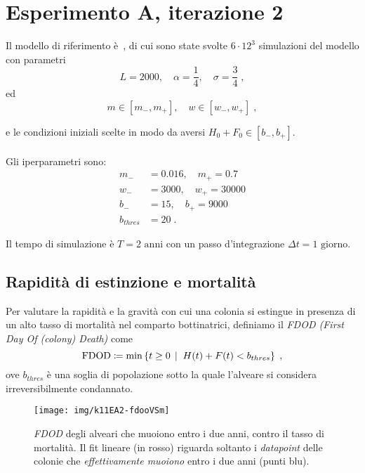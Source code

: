 \section{Esperimento A, iterazione 2}
Il modello di riferimento è~\cite{khoury2011}, di cui sono state svolte $6 \cdot 12^{3}$ simulazioni del
modello con parametri
$$L = 2000, \quad \alpha = \frac{1}{4}, \quad \sigma = \frac{3}{4} \; ,$$
ed
$$m \in \left[ m_-, m_+ \right], \quad w \in \left[ w_-, w_+ \right] \; ,$$

e le condizioni iniziali scelte in modo da aversi $H_0+F_0 \in \left[ b_-, b_+ \right]$.

\paragraph{}
Gli iperparametri sono:
\begin{equation*}
\begin{split}
m_- &= 0.016, \quad m_+ = 0.7 \\
w_- &= 3000, \quad w_+ = 30000 \\
b_- &= 15, \quad b_+ = 9000 \\
b_{thres} &= 20 \; .
\end{split}
\end{equation*}

Il tempo di simulazione è $T=2 \text{ anni}$ con un passo d'integrazione $\Delta t = 1 \text{ giorno}$.

\subsection{Rapidità di estinzione e mortalità}
Per valutare la rapidità e la gravità con cui una colonia si estingue in presenza di un alto tasso di
mortalità nel comparto bottinatrici, definiamo il \emph{FDOD (First Day Of (colony) Death)} come
$$\text{FDOD} \coloneq \min \left\{ t \geq 0 \,\mid\; H(t) + F(t) < b_{thres} \right\} \; ,$$
ove $b_{thres}$ è una soglia di popolazione sotto la quale l'alveare si considera
irreversibilmente condannato.
\begin{figure}[hbt]
    \centering
    \texttt{[image: img/k11EA2-fdooVSm]}

    \caption[Esperimento A2, \emph{FDOD} vs. mortalità.]{\emph{FDOD} degli alveari che muoiono entro i due anni,
        contro il tasso di mortalità. Il fit lineare (in rosso) riguarda soltanto i \emph{datapoint}
        delle colonie che \emph{effettivamente muoiono} entro i due anni (punti blu).}

    \label{img:kh11expA21}
\end{figure}

